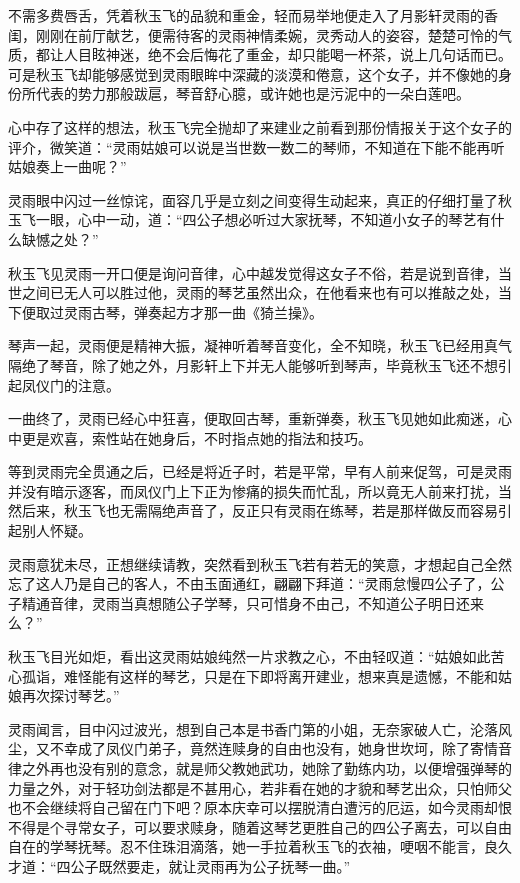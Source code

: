 不需多费唇舌，凭着秋玉飞的品貌和重金，轻而易举地便走入了月影轩灵雨的香闺，刚刚在前厅献艺，便需待客的灵雨神情柔婉，灵秀动人的姿容，楚楚可怜的气质，都让人目眩神迷，绝不会后悔花了重金，却只能喝一杯茶，说上几句话而已。可是秋玉飞却能够感觉到灵雨眼眸中深藏的淡漠和倦意，这个女子，并不像她的身份所代表的势力那般跋扈，琴音舒心臆，或许她也是污泥中的一朵白莲吧。

心中存了这样的想法，秋玉飞完全抛却了来建业之前看到那份情报关于这个女子的评介，微笑道：“灵雨姑娘可以说是当世数一数二的琴师，不知道在下能不能再听姑娘奏上一曲呢？”

灵雨眼中闪过一丝惊诧，面容几乎是立刻之间变得生动起来，真正的仔细打量了秋玉飞一眼，心中一动，道：“四公子想必听过大家抚琴，不知道小女子的琴艺有什么缺憾之处？”

秋玉飞见灵雨一开口便是询问音律，心中越发觉得这女子不俗，若是说到音律，当世之间已无人可以胜过他，灵雨的琴艺虽然出众，在他看来也有可以推敲之处，当下便取过灵雨古琴，弹奏起方才那一曲《猗兰操》。

琴声一起，灵雨便是精神大振，凝神听着琴音变化，全不知晓，秋玉飞已经用真气隔绝了琴音，除了她之外，月影轩上下并无人能够听到琴声，毕竟秋玉飞还不想引起凤仪门的注意。

一曲终了，灵雨已经心中狂喜，便取回古琴，重新弹奏，秋玉飞见她如此痴迷，心中更是欢喜，索性站在她身后，不时指点她的指法和技巧。

等到灵雨完全贯通之后，已经是将近子时，若是平常，早有人前来促驾，可是灵雨并没有暗示逐客，而凤仪门上下正为惨痛的损失而忙乱，所以竟无人前来打扰，当然后来，秋玉飞也无需隔绝声音了，反正只有灵雨在练琴，若是那样做反而容易引起别人怀疑。

灵雨意犹未尽，正想继续请教，突然看到秋玉飞若有若无的笑意，才想起自己全然忘了这人乃是自己的客人，不由玉面通红，翩翩下拜道：“灵雨怠慢四公子了，公子精通音律，灵雨当真想随公子学琴，只可惜身不由己，不知道公子明日还来么？”

秋玉飞目光如炬，看出这灵雨姑娘纯然一片求教之心，不由轻叹道：“姑娘如此苦心孤诣，难怪能有这样的琴艺，只是在下即将离开建业，想来真是遗憾，不能和姑娘再次探讨琴艺。”

灵雨闻言，目中闪过波光，想到自己本是书香门第的小姐，无奈家破人亡，沦落风尘，又不幸成了凤仪门弟子，竟然连赎身的自由也没有，她身世坎坷，除了寄情音律之外再也没有别的意念，就是师父教她武功，她除了勤练内功，以便增强弹琴的力量之外，对于轻功剑法都是不甚用心，若非看在她的才貌和琴艺出众，只怕师父也不会继续将自己留在门下吧？原本庆幸可以摆脱清白遭污的厄运，如今灵雨却恨不得是个寻常女子，可以要求赎身，随着这琴艺更胜自己的四公子离去，可以自由自在的学琴抚琴。忍不住珠泪滴落，她一手拉着秋玉飞的衣袖，哽咽不能言，良久才道：“四公子既然要走，就让灵雨再为公子抚琴一曲。”

